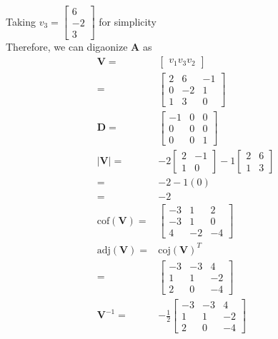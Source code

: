 \documentclass[12pt]{article}
\newcommand{\matr}[1]{\mathbf{#1}}
\begin{document}
Taking $v_3 = \begin{bmatrix}
6 \\ -2 \\ 3
\end{bmatrix} $  for simplicity\\
Therefore, we can digaonize $\matr A$ as
\begin{align}
	\matr V =& \begin{bmatrix}v_1 v_3 v_2\end{bmatrix} \\
	=               & \left[\begin{matrix}2              & 6  & -1 \\0 & -2 & 1\\1 & 3 & 0\end{matrix}\right] \\
	\matr D =       & \left[\begin{matrix}-1             & 0  & 0  \\0 & 0 & 0\\0 & 0 & 1\end{matrix}\right] \\
	|\matr V|=&-2
	\begin{bmatrix}
	2 & -1 \\
	1 & 0
	\end{bmatrix}
	-1
	\begin{bmatrix}
	2 & 6 \\
	1 & 3
	\end{bmatrix} \\
	=& -2 - 1 (0) \\
	=& -2 \\
	\textrm{cof} (\matr V) =& 
	\begin{bmatrix}
	-3 & 1 & 2 \\
	- 3 & 1 & 0 \\
	4 & -2 &  -4 
	\end{bmatrix} \\
	\textrm{adj}(\matr V) =& \textrm{coj}(\matr V) ^ T \\
	=               & \left[\begin{matrix}-3             & -3 & 4  \\1 & 1 & -2\\2 & 0 & -4\end{matrix}\right] \\
	\matr V ^{-1} = & - \frac 1 2 \left[\begin{matrix}-3 & -3 & 4  \\1 & 1 & -2\\2 & 0 & -4\end{matrix}\right] 
\end{align}
\end{document}
